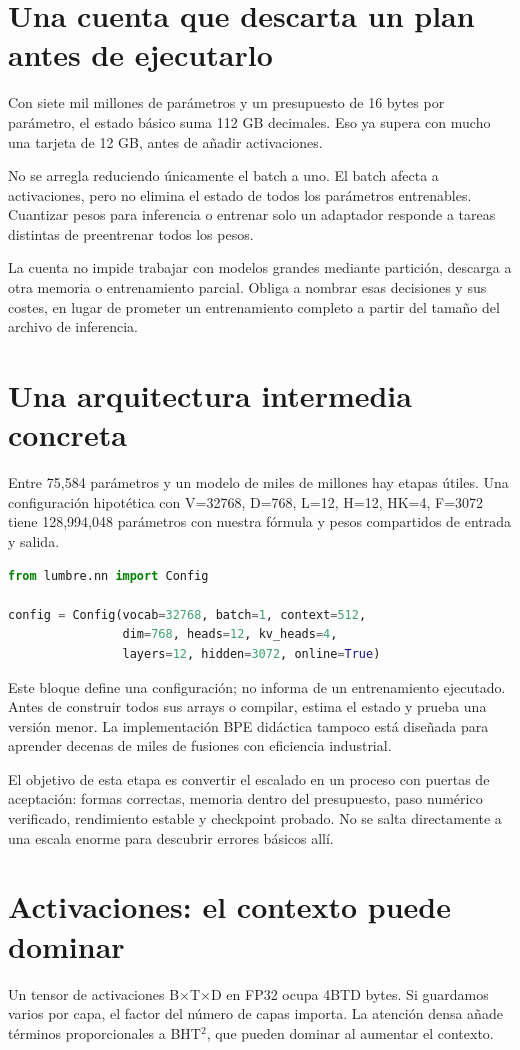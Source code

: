 \documentclass[12pt,a4paper,oneside]{report}
\begin{document}
\section{Una cuenta que descarta un plan antes de ejecutarlo}
Con siete mil millones de parámetros y un presupuesto de 16 bytes por parámetro, el estado básico suma 112 GB decimales. Eso ya supera con mucho una tarjeta de 12 GB, antes de añadir activaciones.

No se arregla reduciendo únicamente el batch a uno. El batch afecta a activaciones, pero no elimina el estado de todos los parámetros entrenables. Cuantizar pesos para inferencia o entrenar solo un adaptador responde a tareas distintas de preentrenar todos los pesos.

La cuenta no impide trabajar con modelos grandes mediante partición, descarga a otra memoria o entrenamiento parcial. Obliga a nombrar esas decisiones y sus costes, en lugar de prometer un entrenamiento completo a partir del tamaño del archivo de inferencia.

\section{Una arquitectura intermedia concreta}
Entre 75,584 parámetros y un modelo de miles de millones hay etapas útiles. Una configuración hipotética con V=32768, D=768, L=12, H=12, HK=4, F=3072 tiene 128,994,048 parámetros con nuestra fórmula y pesos compartidos de entrada y salida.

\begin{lstlisting}[language=Python]
from lumbre.nn import Config

config = Config(vocab=32768, batch=1, context=512,
                dim=768, heads=12, kv_heads=4,
                layers=12, hidden=3072, online=True)
\end{lstlisting}
Este bloque define una configuración; no informa de un entrenamiento ejecutado. Antes de construir todos sus arrays o compilar, estima el estado y prueba una versión menor. La implementación BPE didáctica tampoco está diseñada para aprender decenas de miles de fusiones con eficiencia industrial.

El objetivo de esta etapa es convertir el escalado en un proceso con puertas de aceptación: formas correctas, memoria dentro del presupuesto, paso numérico verificado, rendimiento estable y checkpoint probado. No se salta directamente a una escala enorme para descubrir errores básicos allí.

\section{Activaciones: el contexto puede dominar}
Un tensor de activaciones B\ensuremath{\times}T\ensuremath{\times}D en FP32 ocupa 4BTD bytes. Si guardamos varios por capa, el factor del número de capas importa. La atención densa añade términos proporcionales a BHT\ensuremath{^2}, que pueden dominar al aumentar el contexto.
\end{document}
